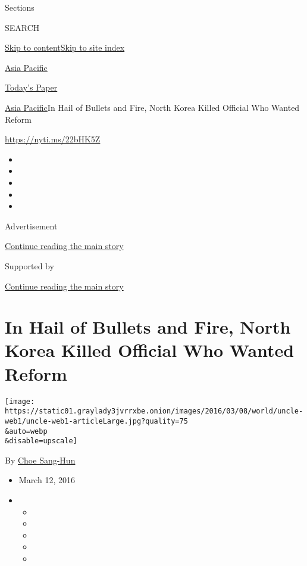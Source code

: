 Sections

SEARCH

\protect\hyperlink{site-content}{Skip to
content}\protect\hyperlink{site-index}{Skip to site index}

\href{https://www.nytimes3xbfgragh.onion/section/world/asia}{Asia
Pacific}

\href{https://myaccount.nytimes3xbfgragh.onion/auth/login?response_type=cookie\&client_id=vi}{}

\href{https://www.nytimes3xbfgragh.onion/section/todayspaper}{Today's
Paper}

\href{/section/world/asia}{Asia Pacific}\textbar{}In Hail of Bullets and
Fire, North Korea Killed Official Who Wanted Reform

\url{https://nyti.ms/22bHK5Z}

\begin{itemize}
\item
\item
\item
\item
\item
\end{itemize}

Advertisement

\protect\hyperlink{after-top}{Continue reading the main story}

Supported by

\protect\hyperlink{after-sponsor}{Continue reading the main story}

\hypertarget{in-hail-of-bullets-and-fire-north-korea-killed-official-who-wanted-reform}{%
\section{In Hail of Bullets and Fire, North Korea Killed Official Who
Wanted
Reform}\label{in-hail-of-bullets-and-fire-north-korea-killed-official-who-wanted-reform}}

\texttt{[image: https://static01.graylady3jvrrxbe.onion/images/2016/03/08/world/uncle-web1/uncle-web1-articleLarge.jpg?quality=75\\\&auto=webp\\\&disable=upscale]}

By \href{http://www.nytimes3xbfgragh.onion/by/choe-sang-hun}{Choe
Sang-Hun}

\begin{itemize}
\item
  March 12, 2016
\item
  \begin{itemize}
  \item
  \item
  \item
  \item
  \item
  \end{itemize}
\end{itemize}

